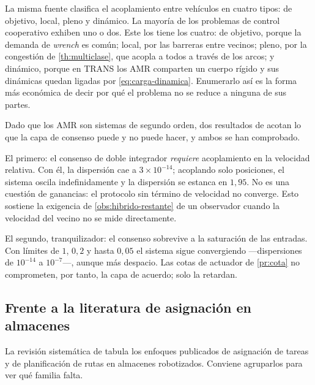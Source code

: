 \begin{observacion}
\label{obs:acoplamientos}
La misma fuente clasifica el acoplamiento entre vehículos en cuatro tipos: de
objetivo, local, pleno y dinámico. La mayoría de los problemas de control
cooperativo exhiben uno o dos. Este los tiene los cuatro: de objetivo, porque la
demanda de \emph{wrench} es común; local, por las barreras entre vecinos; pleno,
por la congestión de \cref{th:multiclase}, que acopla a todos a través de los
arcos; y dinámico, porque en \textsf{TRANS} los AMR comparten un cuerpo rígido y
sus dinámicas quedan ligadas por \cref{eq:carga-dinamica}. Enumerarlo así es la
forma más económica de decir por qué el problema no se reduce a ninguna de sus
partes.
\end{observacion}

\begin{observacion}
\label{obs:segundo-orden}
Dado que los AMR son sistemas de segundo orden, dos resultados de
\cite{ren2008distributed} acotan lo que la capa de consenso puede y no puede
hacer, y ambos se han comprobado.

El primero: el consenso de doble integrador \emph{requiere} acoplamiento en la
velocidad relativa. Con él, la dispersión cae a $3\times10^{-14}$; acoplando
solo posiciones, el sistema oscila indefinidamente y la dispersión se estanca en
$1{,}95$. No es una cuestión de ganancias: el protocolo sin término de velocidad
no converge. Esto sostiene la exigencia de \cref{obs:hibrido-restante} de un
observador cuando la velocidad del vecino no se mide directamente.

El segundo, tranquilizador: el consenso sobrevive a la saturación de las
entradas. Con límites de $1$, $0{,}2$ y hasta $0{,}05$ el sistema sigue
convergiendo —dispersiones de $10^{-14}$ a $10^{-7}$—, aunque más despacio. Las
cotas de actuador de \cref{pr:cota} no comprometen, por tanto, la capa de
acuerdo; solo la retardan.
\end{observacion}

\subsection{Frente a la literatura de asignación en almacenes}

La revisión sistemática de \cite{yildirim2023warehouse} tabula los enfoques
publicados de asignación de tareas y de planificación de rutas en almacenes
robotizados. Conviene agruparlos para ver qué familia falta.

